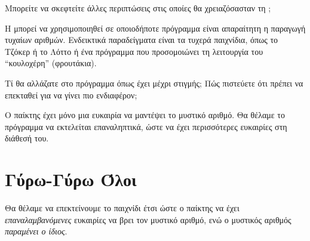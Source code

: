 \documentclass[a4paper,11pt,oneside]{book}
\begin{document}
\begin{step}
Μπορείτε να σκεφτείτε άλλες περιπτώσεις στις οποίες θα χρειαζόσασταν τη ;

\begin{answer}
Η  μπορεί να χρησιμοποιηθεί σε οποιοδήποτε πρόγραμμα είναι απαραίτητη η παραγωγή τυχαίων αριθμών. Ενδεικτικά παραδείγματα είναι τα τυχερά παιχνίδια, όπως το Τζόκερ ή το Λόττο ή ένα πρόγραμμα που προσομοιώνει τη λειτουργία του ``κουλοχέρη'' (φρουτάκια).
\end{answer}
\end{step}

\begin{step}
Τί θα αλλάζατε στο πρόγραμμα όπως έχει μέχρι στιγμής; Πώς πιστεύετε ότι πρέπει να επεκταθεί για να γίνει πιο ενδιαφέρον;

\begin{answer}
Ο παίκτης έχει μόνο μια ευκαιρία να μαντέψει το μυστικό αριθμό. Θα θέλαμε το πρόγραμμα να εκτελείται επαναληπτικά, ώστε να έχει περισσότερες ευκαιρίες στη διάθεσή του.
\end{answer}
\end{step}

\section{Γύρω-Γύρω Όλοι}
Θα θέλαμε να επεκτείνουμε το παιχνίδι έτσι ώστε ο παίκτης να έχει \emph{επαναλαμβανόμενες} ευκαιρίες να βρει τον μυστικό αριθμό, ενώ ο μυστικός αριθμός \emph{παραμένει ο ίδιος}.
\end{document}
